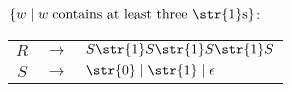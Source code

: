 $\{w \mid w \; \text{contains at least three \str{1}s}\}$: \par
\begin{tabular}{ccl}
	$R$ & $\rightarrow$ & $S\str{1}S\str{1}S\str{1}S$ \\
	$S$ & $\rightarrow$ & $\str{0} \mid \str{1} \mid \epsilon$ \\
\end{tabular}